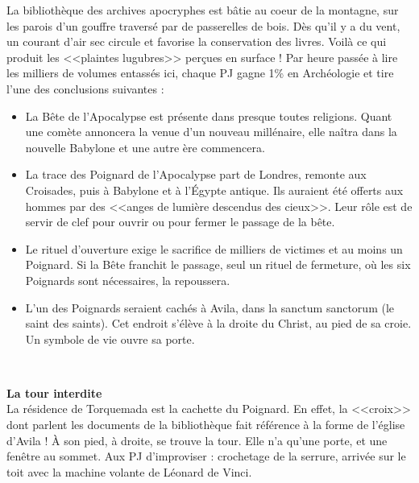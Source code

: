 \documentclass[11pt,twoside,a4paper]{book}
\begin{document}
La biblioth{\`e}que des archives apocryphes est b{\^a}tie au coeur de la montagne, sur les parois d'un gouffre travers{\'e} par de passerelles de bois. D{\`e}s qu'il y a du vent, un courant d'air sec circule et favorise la conservation des livres. Voil{\`a} ce qui produit les <<plaintes lugubres>> per\c{c}ues en surface ! Par heure pass{\'e}e {\`a} lire les milliers de volumes entass{\'e}s ici, chaque PJ gagne 1\% en Arch{\'e}ologie et tire l'une des conclusions suivantes :~\\
\setlength\parindent{20pt}
\begin{itemize}
	\item La B{\^e}te de l'Apocalypse est pr{\'e}sente dans presque toutes religions. Quant une com{\`e}te annoncera la venue d'un nouveau mill{\'e}naire, elle na{\^i}tra dans la nouvelle Babylone et une autre {\`e}re commencera.
	\item La trace des Poignard de l'Apocalypse part de Londres, remonte aux Croisades, puis {\`a} Babylone et {\`a} l'{\'E}gypte antique. Ils auraient {\'e}t{\'e} offerts aux hommes par des <<anges de lumi{\`e}re descendus des cieux>>. Leur r{\^o}le est de servir de clef pour ouvrir ou pour fermer le passage de la b{\^e}te.
	\item Le rituel d'ouverture exige le sacrifice de milliers de victimes et au moins un Poignard. Si la B{\^e}te franchit le passage, seul un rituel de fermeture, o{\`u} les six Poignards sont n{\'e}cessaires, la repoussera.
	\item L'un des Poignards seraient cach{\'e}s {\`a} Avila, dans la sanctum sanctorum (le saint des saints). Cet endroit s'{\'e}l{\`e}ve {\`a} la droite du Christ, au pied de sa croie. Un symbole de vie ouvre sa porte.
\end{itemize}~\\
\setlength\parindent{0pt}

\textbf{\large La tour interdite}~\\

La r{\'e}sidence de Torquemada est la cachette du Poignard. En effet, la <<croix>> dont parlent les documents de la biblioth{\`e}que fait r{\'e}f{\'e}rence {\`a} la forme de l'{\'e}glise d'Avila ! {\`A} son pied, {\`a} droite, se trouve la tour. Elle n'a qu'une porte, et une fen{\^e}tre au sommet. Aux PJ d'improviser : crochetage de la serrure, arriv{\'e}e sur le toit avec la machine volante de L{\'e}onard de Vinci.~\\
\end{document}
